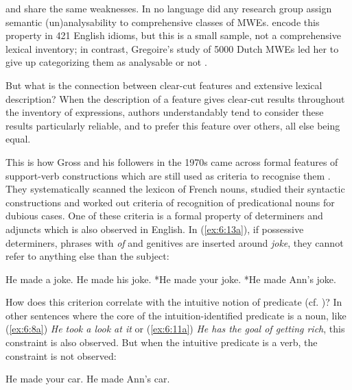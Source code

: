 \documentclass[output=paper]{langsci/langscibook}
\begin{document}
\cite{Sag:2002}  and \cite{Baldwin2010} share the same weaknesses. In no language did any research group assign semantic (un)analysability to comprehensive classes of MWEs. \cite[64]{Bond}  encode this property in 421 English idioms, but this is a small sample, not a comprehensive lexical inventory; in contrast, Gregoire’s study of 5000 Dutch MWEs led her to give up categorizing them as analysable or not \citep[31--32]{Gregoire2010}.

But what is the connection between clear-cut features and extensive lexical description? When the description of a feature gives clear-cut results throughout the inventory of expressions, authors understandably tend to consider these results particularly reliable, and to prefer this feature over others, all else being equal.

This is how Gross and his followers in the 1970s came across formal features of support-verb constructions which are still used as criteria to recognise them \citep{Langer2005}. They systematically scanned the lexicon of French nouns, studied their syntactic constructions and worked out criteria of recognition of predicational nouns for dubious cases. One of these criteria is a formal property of determiners and adjuncts \citep[109]{Gross1976} which is also observed in English. In (\ref{ex:6:13a}), if possessive determiners, phrases with \textit{of} and genitives are inserted around \textit{joke}, they cannot refer to anything else than the subject:


\begin{exe}
\ex \label{ex:6:13}
\begin{xlist}
\ex \label{ex:6:13a}
He made a joke.
\ex \label{ex:6:13b}
He made his joke.
\ex \label{ex:6:13c}
*He made your joke.
\ex \label{ex:6:13cd}
 *He made Ann’s joke.
 \end{xlist}
\end{exe}

How does this criterion correlate with the intuitive notion of predicate (cf. )? In other sentences where the core of the intuition-identified predicate is a noun, like (\ref{ex:6:8a}) \textit{He took a look at it} or (\ref{ex:6:11a}) \textit{He has the goal of getting rich}, this constraint is also observed. But when the intuitive predicate is a verb, the constraint is not observed:


\begin{exe}
\ex \label{ex:6:14}
\begin{xlist}
\ex \label{ex:6:14a}	
He made your car.
\ex \label{ex:6:14b}	
He made Ann’s car.
\end{xlist}
\end{exe}
\end{document}
